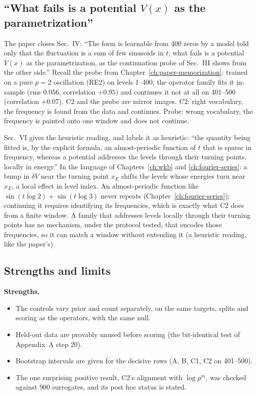 \subsection{``What fails is a potential $V(x)$ as the parametrization''}

The paper closes Sec.~IV: ``The form is learnable from 400 zeros by a model told only that the fluctuation is a sum of few sinusoids in $t$; what fails is a potential $V(x)$ as the parametrization, as the continuation probe of Sec.~III shows from the other side.'' Recall the probe from Chapter~\ref{ch:paper-memorization}: trained on a pure $p=2$ oscillation (RE2) on levels 1--400, the operator family fits it in-sample (rms $0.056$, correlation $+0.95$) and continues it not at all on 401--500 (correlation $+0.07$). C2 and the probe are mirror images. C2: right vocabulary, the frequency is found from the data and continues. Probe: wrong vocabulary, the frequency is painted onto one window and does not continue.

Sec.~VI gives the heuristic reading, and labels it as heuristic: ``the quantity being fitted is, by the explicit formula, an almost-periodic function of $t$ that is sparse in frequency, whereas a potential addresses the levels through their turning points, locally in energy.'' In the language of Chapters~\ref{ch:wkb} and \ref{ch:fourier-series}: a bump in $\delta V$ near the turning point $x_E$ shifts the levels whose energies turn near $x_E$, a local effect in level index. An almost-periodic function like $\sin(t\log2)+\sin(t\log3)$ never repeats (Chapter~\ref{ch:fourier-series}); continuing it requires identifying its frequencies, which is exactly what C2 does from a finite window. A family that addresses levels locally through their turning points has no mechanism, under the protocol tested, that encodes those frequencies, so it can match a window without extending it (a heuristic reading, like the paper's).

\subsection{Strengths and limits}

\textbf{Strengths.}
\begin{itemize}
\item The controls vary prior and count separately, on the same targets, splits and scoring as the operators, with the same null.
\item Held-out data are provably unused before scoring (the bit-identical test of Appendix~A step 20).
\item Bootstrap intervals are given for the decisive rows (A, B, C1, C2 on 401--500).
\item The one surprising positive result, C2's alignment with $\log p^m$, was checked against 900 surrogates, and its post hoc status is stated.
\end{itemize}

